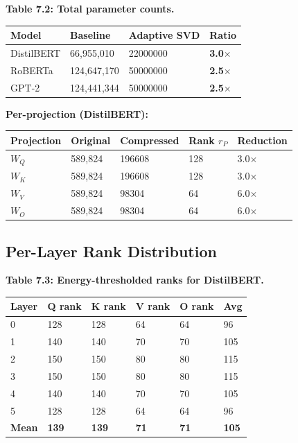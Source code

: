 \textbf{Table 7.2: Total parameter counts.}

\begin{table}[H]
\centering
\small
\begin{tabular}{llll}
\toprule
\textbf{Model} & \textbf{Baseline} & \textbf{Adaptive SVD} & \textbf{Ratio} \\
\midrule
DistilBERT & 66,955,010 & 22000000 & \textbf{3.0$\times$} \\
RoBERTa & 124,647,170 & 50000000 & \textbf{2.5$\times$} \\
GPT-2 & 124,441,344 & 50000000 & \textbf{2.5$\times$} \\
\bottomrule
\end{tabular}
\end{table}

\textbf{Per-projection (DistilBERT):}

\begin{table}[H]
\centering
\small
\begin{tabular}{lllll}
\toprule
\textbf{Projection} & \textbf{Original} & \textbf{Compressed} & \textbf{Rank $r_P$} & \textbf{Reduction} \\
\midrule
$W_Q$ & 589,824 & 196608 & 128 & 3.0$\times$ \\
$W_K$ & 589,824 & 196608 & 128 & 3.0$\times$ \\
$W_V$ & 589,824 & 98304 & 64 & 6.0$\times$ \\
$W_O$ & 589,824 & 98304 & 64 & 6.0$\times$ \\
\bottomrule
\end{tabular}
\end{table}

\subsection{Per-Layer Rank Distribution}

\textbf{Table 7.3: Energy-thresholded ranks for DistilBERT.}

\begin{table}[H]
\centering
\small
\begin{tabular}{llllll}
\toprule
\textbf{Layer} & \textbf{Q rank} & \textbf{K rank} & \textbf{V rank} & \textbf{O rank} & \textbf{Avg} \\
\midrule
0 & 128 & 128 & 64 & 64 & 96 \\
1 & 140 & 140 & 70 & 70 & 105 \\
2 & 150 & 150 & 80 & 80 & 115 \\
3 & 150 & 150 & 80 & 80 & 115 \\
4 & 140 & 140 & 70 & 70 & 105 \\
5 & 128 & 128 & 64 & 64 & 96 \\
\textbf{Mean} & \textbf{139} & \textbf{139} & \textbf{71} & \textbf{71} & \textbf{105} \\
\bottomrule
\end{tabular}
\end{table}

